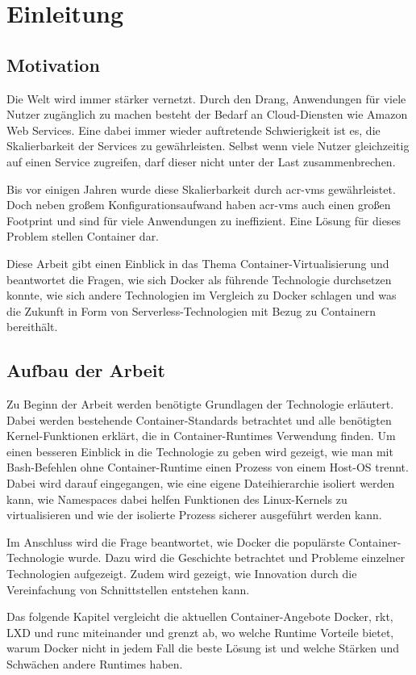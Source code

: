 \chapter{Einleitung}
\label{chap:einleitung}

\section{Motivation}
\label{sec:motivation}
Die Welt wird immer stärker vernetzt. Durch den Drang, Anwendungen für viele Nutzer zugänglich zu machen besteht der Bedarf an Cloud-Diensten wie Amazon Web Services.
Eine dabei immer wieder auftretende Schwierigkeit ist es, die Skalierbarkeit der Services zu gewährleisten. Selbst wenn viele Nutzer gleichzeitig auf einen Service zugreifen, darf dieser nicht unter der Last zusammenbrechen.

Bis vor einigen Jahren wurde diese Skalierbarkeit durch \glspl{acr-vm} gewährleistet. Doch neben großem Konfigurationsaufwand haben \glspl{acr-vm} auch einen großen Footprint und sind für viele  Anwendungen zu ineffizient. Eine Lösung für dieses Problem stellen Container dar.

Diese Arbeit gibt einen Einblick in das Thema Container-Virtualisierung und beantwortet die Fragen, wie sich Docker als führende Technologie durchsetzen konnte, wie sich andere Technologien im Vergleich zu Docker schlagen und was die Zukunft in Form von Serverless-Technologien mit Bezug zu Containern bereithält.

\section{Aufbau der Arbeit}
\label{sec:aufbau}
Zu Beginn der Arbeit werden benötigte Grundlagen der Technologie erläutert. Dabei werden bestehende Container-Standards betrachtet und alle benötigten Kernel-Funktionen erklärt, die in Container-Runtimes Verwendung finden. Um einen besseren Einblick in die Technologie zu geben wird gezeigt, wie man mit Bash-Befehlen ohne Container-Runtime einen Prozess von einem Host-OS trennt. Dabei wird darauf eingegangen, wie eine eigene Dateihierarchie isoliert werden kann, wie Namespaces dabei helfen Funktionen des Linux-Kernels zu virtualisieren und wie der isolierte Prozess sicherer ausgeführt werden kann.

Im Anschluss wird die Frage beantwortet, wie Docker die populärste Container-Technologie wurde. Dazu wird die Geschichte betrachtet und Probleme einzelner Technologien aufgezeigt. Zudem wird gezeigt, wie Innovation durch die Vereinfachung von Schnittstellen entstehen kann.

Das folgende Kapitel vergleicht die aktuellen Container-Angebote Docker, rkt, LXD und runc miteinander und grenzt ab, wo welche Runtime Vorteile bietet, warum Docker nicht in jedem Fall die beste Lösung ist und welche Stärken und Schwächen andere Runtimes haben.

